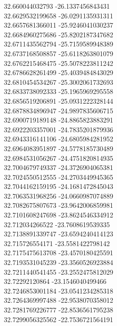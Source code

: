 {32.660044032793	-26.1337456843431\\
32.6629532199658	-26.0291135931311\\
32.6657681366011	-25.9246041030237\\
32.6684960275686	-25.8202187347682\\
32.6711435562794	-25.7159589948389\\
32.6737168508857	-25.6118263801079\\
32.6762215468475	-25.5078223811242\\
32.6786628261499	-25.4039484843029\\
32.6810454534267	-25.3002061732693\\
32.6833738092333	-25.1965969295558\\
32.6856519206891	-25.0931222328144\\
32.6878834896947	-24.9897835606715\\
32.6900719189148	-24.8865823883291\\
32.6922203357001	-24.7835201879936\\
32.6943316141106	-24.6805984281952\\
32.6964083951897	-24.5778185730489\\
32.6984531056267	-24.4751820814935\\
32.7004679749337	-24.3726904065381\\
32.7024550512555	-24.2703449945365\\
32.7044162159195	-24.1681472845043\\
32.7063531968256	-24.0660987074889\\
32.7082675807673	-23.9642006859981\\
32.7101608247698	-23.8624546334912\\
32.712034266522	-23.7608619539335\\
32.7138891339747	-23.6594240414123\\
32.715726554171	-23.5581422798142\\
32.7175475613708	-23.4570180425591\\
32.7193531045239	-23.3560526923884\\
32.7211440541455	-23.2552475812029\\
32.72292120864	-23.1546040499466\\
32.7246853001184	-23.0541234285318\\
32.7264369997488	-22.9538070358012\\
32.7281769226777	-22.8536561795238\\
32.7299056325562	-22.7536721564191\\
}
